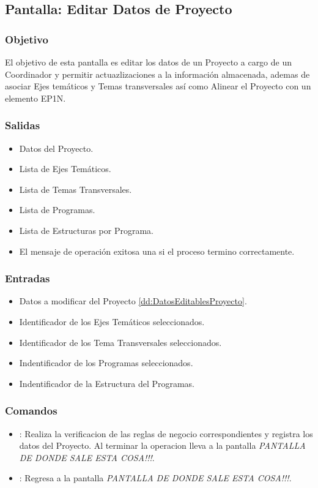 \subsection{Pantalla: Editar Datos de Proyecto}

\subsubsection{Objetivo}
El objetivo de esta pantalla es editar los datos de un Proyecto a cargo de un Coordinador y permitir actuazlizaciones a la información almacenada, ademas de asociar Ejes temáticos y Temas transversales así como Alinear el Proyecto con un elemento EP1N.


\subsubsection{Salidas}
\begin{itemize}
 \item Datos del Proyecto.
 \item Lista de Ejes Temáticos.
 \item Lista de Temas Transversales.
 \item Lista de Programas.
 \item Lista de Estructuras por Programa.
 \item El mensaje de operación exitosa una si el proceso termino correctamente.
\end{itemize}

\subsubsection{Entradas}
\begin{itemize}
 \item Datos a modificar del Proyecto \ref{dd:DatosEditablesProyecto}.
 \item Identificador de los Ejes Temáticos seleccionados.
 \item Identificador de los Tema Transversales seleccionados.
 \item Indentificador de los Programas seleccionados.
 \item Indentificador de la Estructura del Programas.
\end{itemize}

\subsubsection{Comandos}
\begin{itemize}
 \item {}: Realiza la verificacion de las reglas de negocio correspondientes y registra los datos del Proyecto. Al terminar la operacion lleva a la pantalla \textit{PANTALLA DE DONDE SALE ESTA COSA!!!}.
 \item {}: Regresa a la pantalla \textit{PANTALLA DE DONDE SALE ESTA COSA!!!}.
\end{itemize}